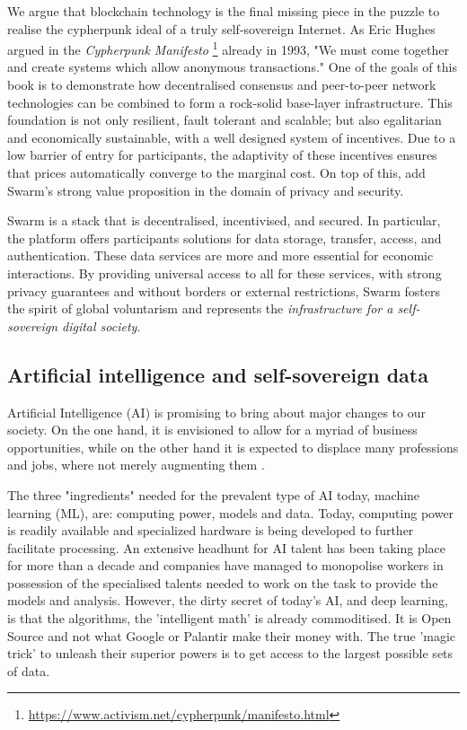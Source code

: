 We argue that blockchain technology is the final missing piece in the puzzle to realise the cypherpunk ideal of a truly self-sovereign Internet. As Eric Hughes argued in the \emph{Cypherpunk Manifesto}%
%
\footnote{\url{https://www.activism.net/cypherpunk/manifesto.html}}
%
already in 1993, "We must come together and create systems which allow anonymous transactions." One of the goals of this book is to demonstrate how decentralised consensus and peer-to-peer network technologies can be combined to form a rock-solid base-layer infrastructure. This foundation is not only resilient, fault tolerant and scalable; but also egalitarian and economically sustainable, with a well designed system of incentives. Due to a low barrier of entry for participants, the adaptivity of these incentives ensures that prices automatically converge to the marginal cost. On top of this, add Swarm's strong value proposition in the domain of privacy and security.

Swarm is a  stack that is decentralised, incentivised, and secured. In particular, the platform offers participants solutions for data storage, transfer, access, and authentication. These data services are more and more essential for economic interactions. By providing universal access to all for these services, with strong privacy guarantees and without borders or external restrictions, Swarm fosters the spirit of global voluntarism and represents the \emph{infrastructure for a self-sovereign digital society}.

\subsection{Artificial intelligence and self-sovereign data \statusgreen} \label{sec:AIdata}

Artificial Intelligence (AI) is promising to bring about major changes to our society. On the one hand, it is envisioned to allow for a myriad of business opportunities, while on the other hand it is expected to displace many professions and jobs, where not merely augmenting them \cite{Lee2018Sep}.

The three "ingredients" needed for the prevalent type of AI today, machine learning (ML), are: computing power, models and data. Today, computing power is readily available and specialized hardware is being developed to further facilitate processing. An extensive headhunt for AI talent has been taking place for more than a decade and companies have  managed to monopolise workers in possession of the specialised talents needed to work on the task to provide the models and analysis. However, the dirty secret of today's AI, and deep learning, is that the algorithms, the 'intelligent math' is already commoditised. It is Open Source and not what Google or Palantir make their money with. The true 'magic trick' to unleash their superior powers is to get access to the largest possible sets of data.


